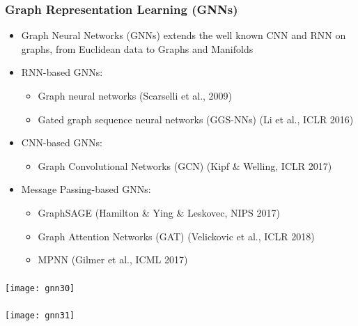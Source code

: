 \begin{frame}[fragile]\frametitle{Graph Representation Learning (GNNs)}

\begin{itemize}
		\item Graph Neural Networks (GNNs) extends the well known CNN and RNN on graphs, from Euclidean data to Graphs and Manifolds
		\item RNN-based GNNs: 
		\begin{itemize}
		\item Graph neural networks (Scarselli et al., 2009)
		\item Gated graph sequence neural networks (GGS-NNs) (Li et al., ICLR 2016)
		\end{itemize}

		\item CNN-based GNNs: 
		\begin{itemize}
 		\item Graph Convolutional Networks (GCN) (Kipf \& Welling, ICLR 2017)
		\end{itemize}

		\item Message Passing-based GNNs:
		\begin{itemize}
 		\item GraphSAGE (Hamilton \& Ying \& Leskovec, NIPS 2017)
 		\item Graph Attention Networks (GAT) (Velickovic et al., ICLR 2018) 
 		\item MPNN (Gilmer et al., ICML 2017)
		\end{itemize}

\end{itemize}

\end{frame}

\begin{frame}[fragile]\frametitle{}

\begin{center}
\texttt{[image: gnn30]}
\end{center}	  

\end{frame}

\begin{frame}[fragile]\frametitle{}

\begin{center}
\texttt{[image: gnn31]}
\end{center}	  

\end{frame}

